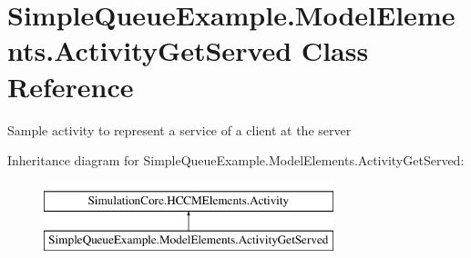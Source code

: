 \hypertarget{class_simple_queue_example_1_1_model_elements_1_1_activity_get_served}{}\section{Simple\+Queue\+Example.\+Model\+Elements.\+Activity\+Get\+Served Class Reference}
\label{class_simple_queue_example_1_1_model_elements_1_1_activity_get_served}


Sample activity to represent a service of a client at the server  


Inheritance diagram for Simple\+Queue\+Example.\+Model\+Elements.\+Activity\+Get\+Served\+:\begin{figure}[H]
\begin{center}
\leavevmode
\includegraphics[height=2.000000cm]{class_simple_queue_example_1_1_model_elements_1_1_activity_get_served}
\end{center}
\end{figure}
